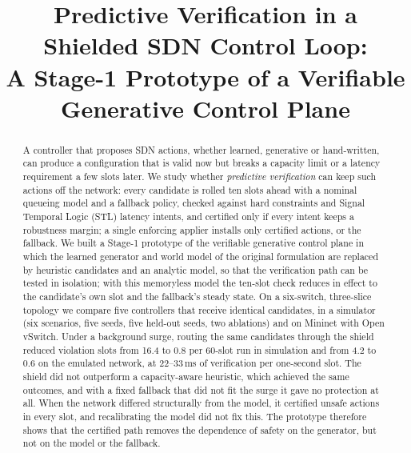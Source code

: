\documentclass[conference]{IEEEtran}
\begin{document}
\title{Predictive Verification in a Shielded SDN Control Loop:\\
A Stage-1 Prototype of a Verifiable Generative Control Plane}

\author{
}

\maketitle

\begin{abstract}
A controller that proposes SDN actions, whether learned, generative or hand-written,
can produce a configuration that is valid now but breaks a capacity limit or a
latency requirement a few slots later. We study whether \emph{predictive
verification} can keep such actions off the network: every candidate is rolled ten
slots ahead with a nominal queueing model and a fallback policy, checked against
hard constraints and Signal Temporal Logic (STL) latency intents, and certified only
if every intent keeps a robustness margin; a single enforcing applier installs only
certified actions, or the fallback. We built a Stage-1 prototype of the verifiable
generative control plane in which the learned generator and world model of the
original formulation are replaced by heuristic candidates and an analytic model, so
that the verification path can be tested in isolation; with this memoryless model
the ten-slot check reduces in effect to the candidate's own slot and the fallback's
steady state. On a six-switch, three-slice
topology we compare five controllers that receive identical candidates, in a
simulator (six scenarios, five seeds, five held-out seeds, two ablations) and on
Mininet with Open vSwitch. Under a background surge, routing the same candidates
through the shield reduced violation slots from 16.4 to 0.8 per 60-slot run in
simulation and from 4.2 to 0.6 on the emulated network, at 22--33\,ms of
verification per one-second slot. The shield did not outperform a capacity-aware
heuristic, which achieved the same outcomes, and with a fixed fallback that did not
fit the surge it gave no protection at all. When the network differed structurally
from the model, it certified unsafe actions in every slot, and recalibrating the
model did not fix this. The prototype therefore shows that the certified path
removes the dependence of safety on the generator, but not on the model or the
fallback.
\end{abstract}
\end{document}
